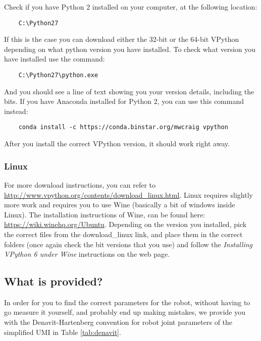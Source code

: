 \documentclass[10pt]{scrartcl}
\begin{document}
Check if you have Python 2 installed on your computer, at the following location:

\begin{verbatim}
    C:\Python27
\end{verbatim}
If this is the case you can download either the 32-bit or the 64-bit VPython depending on what python version you have installed. To check what version you have installed use the command:

\begin{verbatim}
    C:\Python27\python.exe
\end{verbatim}
And you should see a line of text showing you your version details, including the bits. If you have Anaconda installed for Python 2, you can use this command instead:

\begin{verbatim}
    conda install -c https://conda.binstar.org/mwcraig vpython
\end{verbatim}
After you install the correct VPython version, it should work right away.
\subsubsection*{Linux}
For more download instructions, you can refer to \url{http://www.vpython.org/contents/download_linux.html}.
Linux requires slightly more work and requires you to use Wine (basically a bit of windows inside Linux). The installation instructions of Wine, can be found here: \url{https://wiki.winehq.org/Ubuntu}. Depending on the version you installed, pick the correct files from the download\_linux link, and place them in the correct folders (once again check the bit versions that you use) and follow the \emph{Installing VPython 6 under Wine} instructions on the web page.

\subsection*{What is provided?}

In order for you to find the correct parameters for the robot, without having to go measure it yourself, and probably end up making mistakes, we provide you with the Denavit-Hartenberg convention for robot joint parameters of the simplified UMI in Table \ref{tab:denavit}.
\end{document}
